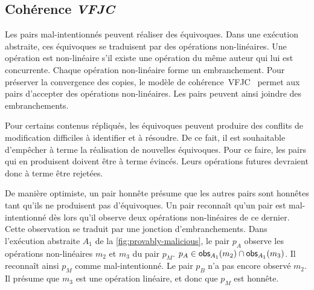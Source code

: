 \subsection{Cohérence \emph{\acl{VFJC}}}

Les pairs mal-intentionnés peuvent réaliser des équivoques.
Dans une exécution abstraite, ces équivoques se traduisent par des opérations non-linéaires.
Une opération est non-linéaire s'il existe une opération du même auteur qui lui est concurrente.
Chaque opération non-linéaire forme un embranchement.
Pour préserver la convergence des copies, le modèle de cohérence~\acf{VFJC}~\autocite{mahajan_2011_cac} permet aux pairs d'accepter des opérations non-linéaires.
Les pairs peuvent ainsi joindre des embranchements.

Pour certains contenus répliqués, les équivoques peuvent produire des conflits de modification difficiles à identifier et à résoudre.
De ce fait, il est souhaitable d'empêcher à terme la réalisation de nouvelles équivoques.
Pour ce faire, les pairs qui en produisent doivent être à terme évincés.
Leurs opérations futures devraient donc à terme être rejetées.

De manière optimiste, un pair honnête présume que les autres pairs sont honnêtes tant qu'ils ne produisent pas d'équivoques.
Un pair reconnaît qu'un pair est mal-intentionné dès lors qu'il observe deux opérations non-linéaires de ce dernier.
Cette observation se traduit par une jonction d'embranchements.
Dans l'exécution abstraite $A_1$ de la \autoref{fig:provably-malicious}, le pair $p_A$ observe les opérations non-linéaires $m_2$ et $m_3$ du pair $p_M$. $p_A \in \operatorname{\mathsf{obs}}_{A_1}(m_2) \cap \operatorname{\mathsf{obs}}_{A_1}(m_3)$.
Il reconnaît ainsi $p_M$ comme mal-intentionné.
Le pair $p_B$ n'a pas encore observé $m_2$. Il présume que $m_3$ est une opération linéaire, et donc que $p_M$ est honnête.

